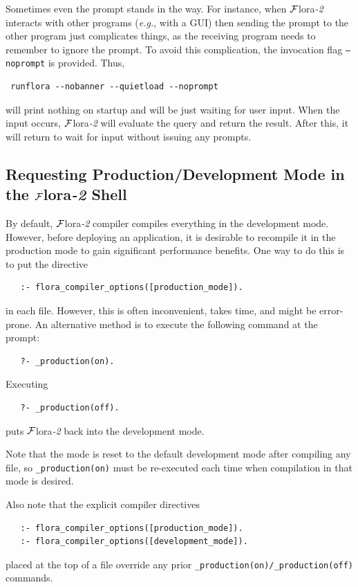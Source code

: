 \documentclass[11pt]{article}
\newcommand{\FLORA}{{\mbox{\sc ${\cal F}${lora}\rm\emph{-2}}}\xspace}
\begin{document}
Sometimes even the prompt stands in the way. For instance, when \FLORA
interacts with other programs ({\it e.g.}, with a GUI) then sending the
prompt to the other program just complicates things, as the receiving
program needs to remember to ignore the prompt. To avoid this complication,
the invocation flag {\tt --noprompt} is provided. Thus,
\begin{verbatim}
 runflora --nobanner --quietload --noprompt
\end{verbatim}
will print nothing on startup and will be just waiting for user input. When
the input occurs, \FLORA will evaluate the query and return the result.
After this, it will return to wait for input without issuing any
prompts.

\subsection{Requesting Production/Development Mode in the \FLORA Shell}
\label{sec-production-shell}

By default, \FLORA compiler compiles everything in the development
mode. However, before deploying an application, it is desirable to
recompile it in the production mode to gain significant performance benefits.
One way to do this is to put the directive
\begin{verbatim}
   :- flora_compiler_options([production_mode]).
\end{verbatim}
in each file. However, this is often inconvenient, takes time, and might be
error-prone. An alternative method is to execute the following command at
the prompt:
\begin{verbatim}
   ?- _production(on).
\end{verbatim}
Executing
\begin{verbatim}
   ?- _production(off).
\end{verbatim}
puts \FLORA back into the development mode.

Note that the mode is reset to the default development mode after compiling
any file, so \texttt{\_production(on)} must be re-executed each time
when compilation in that mode is desired.

Also note that the explicit compiler directives
\begin{verbatim}
   :- flora_compiler_options([production_mode]).
   :- flora_compiler_options([development_mode]).
\end{verbatim}
placed at the top of a file override any prior
\texttt{\_production(on)/\_production(off)} commands. 
 
\end{document}
